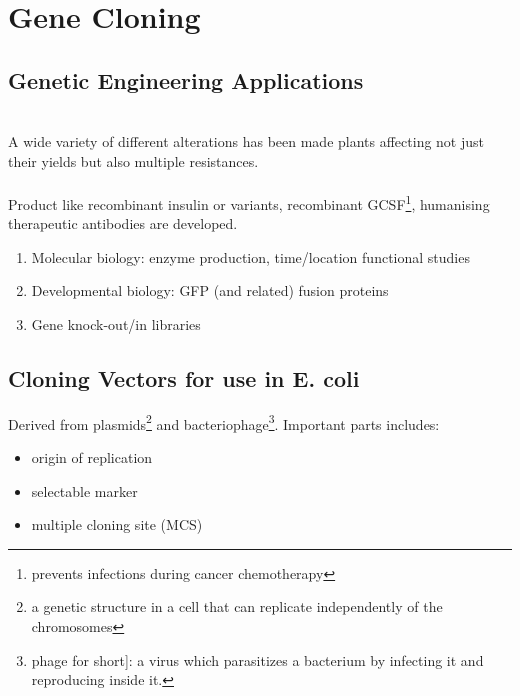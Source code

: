 \chapter{Gene Cloning}

\section{Genetic Engineering Applications}
\\[.1in]
A wide variety of different alterations has been made plants affecting not just their yields but also multiple resistances.\\[.2in]
\\[.1in]
Product like recombinant insulin or variants, recombinant GCSF\footnote{prevents infections during cancer
chemotherapy}, humanising therapeutic antibodies are developed.\\[.2in]
\begin{enumerate}[itemsep=0mm]
    \item Molecular biology: enzyme production, time/location functional studies
    \item Developmental biology: GFP (and related) fusion proteins
    \item Gene knock-out/in libraries
\end{enumerate}

\section{Cloning Vectors for use in E. coli}
Derived from plasmids\footnote{a genetic structure in a cell that can replicate independently of the chromosomes} and bacteriophage\footnote{phage for short]: a virus which parasitizes a bacterium by infecting it and reproducing inside it.}. Important parts includes:
\begin{itemize}
    \item origin of replication
    \item selectable marker
    \item multiple cloning site (MCS)
\end{itemize}

